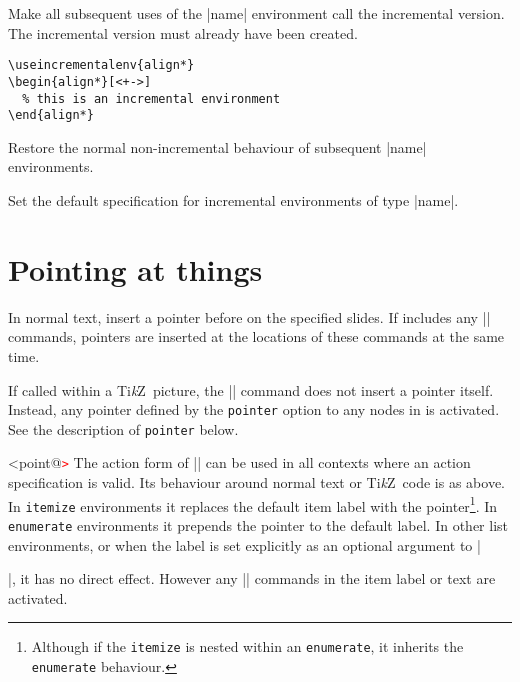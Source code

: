 \documentclass[a4paper]{ltxdoc}
\def\TikZ{Ti\textit{k}Z}
\begin{document}
\begin{command}{{\useincrementalenv}}
  Make all subsequent uses of the |name| environment call the incremental
  version.  The incremental version must already have been created.
  \example
\begin{verbatim}
\useincrementalenv{align*}
\begin{align*}[<+->]
  % this is an incremental environment
\end{align*}
\end{verbatim}
\end{command}

\begin{command}{{\usenonincrementalenv}}
  Restore the normal non-incremental behaviour of  subsequent |name| environments.
\end{command}


\begin{command}{{\setincrementalenvspec}}
  Set the default specification for incremental environments of type |name|.
\end{command}



\section{Pointing at things}\label{sec:point}

\begin{command}{\point{}}
  In normal text, insert a pointer before  on the specified
  slides.  If  includes any |\point*| commands, pointers are
  inserted at the locations of these commands at the same time.

  If called within a \TikZ\ picture, the |\point| command does not insert a
  pointer itself.  Instead, any pointer defined by the \texttt{pointer} option
  to any nodes in  is activated.  See the description of
  \texttt{pointer} below.
\end{command}

\begin{command}{{<point@}\textcolor{red}{\tt >}}
  The action form of |\point| can be used in all contexts where an action
  specification is valid.  Its behaviour around normal text or \TikZ\ code is as
  above.  In \texttt{itemize} environments it replaces the default item label
  with the pointer\footnote{Although if the \texttt{itemize} is nested within an
    \texttt{enumerate}, it inherits the \texttt{enumerate} behaviour.}.  In
  \texttt{enumerate} environments it prepends the pointer to the default label.
  In other list environments, or when the label is set explicitly as an optional
  argument to |\item|, it has no direct effect.  However any |\point*| commands
  in the item label or text are activated.
\end{command}
\end{document}

